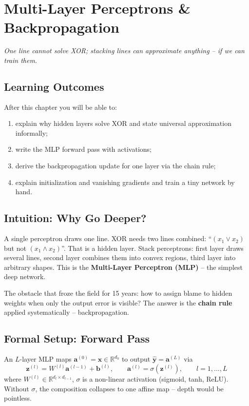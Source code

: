 \chapter{Multi-Layer Perceptrons \& Backpropagation}\label{ch:mlp}
\begin{center}\small\textit{One line cannot solve XOR; stacking lines can approximate anything -- if we can train them.}\end{center}

\noindent{}
\vspace{0.3em}
\section*{Learning Outcomes}
After this chapter you will be able to:
\begin{enumerate}[label=(L\arabic*)]
    \item explain why hidden layers solve XOR and state universal approximation informally;
    \item write the MLP forward pass with activations;
    \item derive the backpropagation update for one layer via the chain rule;
    \item explain initialization and vanishing gradients and train a tiny network by hand.
\end{enumerate}

\section{Intuition: Why Go Deeper?}
A single perceptron draws one line. XOR needs two lines combined: ``$(x_1\lor x_2)$ but not $(x_1\land x_2)$''. That is a hidden layer. Stack perceptrons: first layer draws several lines, second layer combines them into convex regions, third layer into arbitrary shapes. This is the \textbf{Multi-Layer Perceptron (MLP)} -- the simplest deep network.

The obstacle that froze the field for 15 years: how to assign blame to hidden weights when only the output error is visible? The answer is the \textbf{chain rule} applied systematically -- backpropagation.

\section{Formal Setup: Forward Pass}
An $L$-layer MLP maps $\mathbf{a}^{(0)}=\mathbf{x}\in\mathbb{R}^{d_0}$ to output $\hat{\mathbf{y}}=\mathbf{a}^{(L)}$ via
\begin{equation}
\mathbf{z}^{(l)} = W^{(l)}\mathbf{a}^{(l-1)}+\mathbf{b}^{(l)},\qquad \mathbf{a}^{(l)}=\sigma(\mathbf{z}^{(l)}),\qquad l=1,\dots,L
\end{equation}
where $W^{(l)}\in\mathbb{R}^{d_l\times d_{l-1}}$, $\sigma$ is a non-linear activation (sigmoid, tanh, ReLU). Without $\sigma$, the composition collapses to one affine map -- depth would be pointless.

